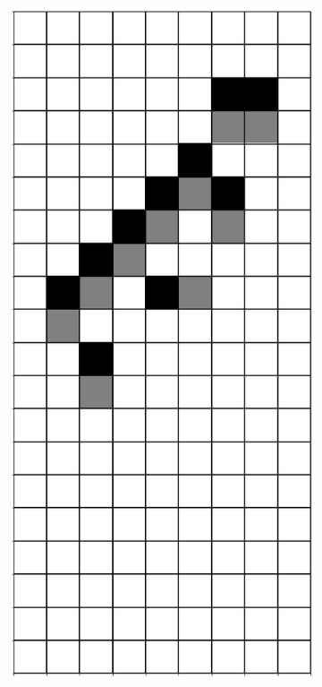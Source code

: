 \documentclass[12pt]{article}
\numberwithin{figure}{section} %
\begin{document}
\begin{figure}[H]
\begin{subfigure}{0.3\textwidth}
     		\subcaption{}
   	\end{subfigure}
     	\begin{subfigure}{0.3\textwidth}
     		\centering
     		\includegraphics[angle=270,width=\linewidth]{Section4/22.7}

\end{subfigure}
\end{figure}
\end{document}

